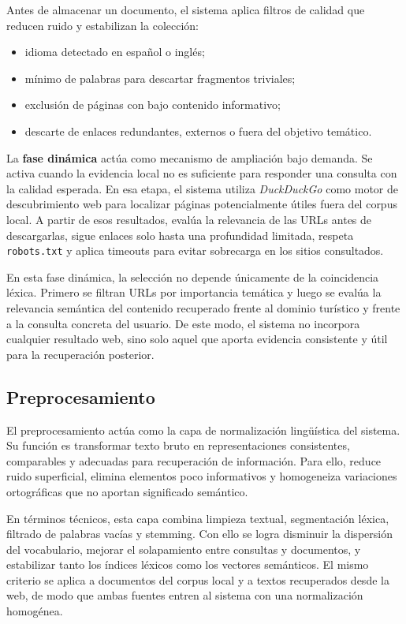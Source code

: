 \documentclass{llncs}
\begin{document}
Antes de almacenar un documento, el sistema aplica filtros de calidad que reducen ruido y estabilizan la colección:

\begin{itemize}
    \item idioma detectado en español o inglés;
    \item mínimo de palabras para descartar fragmentos triviales;
    \item exclusión de páginas con bajo contenido informativo;
    \item descarte de enlaces redundantes, externos o fuera del objetivo temático.
\end{itemize}

La \textbf{fase dinámica} actúa como mecanismo de ampliación bajo demanda. Se activa cuando la evidencia local no es suficiente para responder una consulta con la calidad esperada. En esa etapa, el sistema utiliza \textit{DuckDuckGo} como motor de descubrimiento web para localizar páginas potencialmente útiles fuera del corpus local. A partir de esos resultados, evalúa la relevancia de las URLs antes de descargarlas, sigue enlaces solo hasta una profundidad limitada, respeta \texttt{robots.txt} y aplica timeouts para evitar sobrecarga en los sitios consultados.

En esta fase dinámica, la selección no depende únicamente de la coincidencia léxica. Primero se filtran URLs por importancia temática y luego se evalúa la relevancia semántica del contenido recuperado frente al dominio turístico y frente a la consulta concreta del usuario. De este modo, el sistema no incorpora cualquier resultado web, sino solo aquel que aporta evidencia consistente y útil para la recuperación posterior.

\subsection{Preprocesamiento}

El preprocesamiento actúa como la capa de normalización lingüística del sistema. Su función es transformar texto bruto en representaciones consistentes, comparables y adecuadas para recuperación de información. Para ello, reduce ruido superficial, elimina elementos poco informativos y homogeneiza variaciones ortográficas que no aportan significado semántico.

En términos técnicos, esta capa combina limpieza textual, segmentación léxica, filtrado de palabras vacías y stemming. Con ello se logra disminuir la dispersión del vocabulario, mejorar el solapamiento entre consultas y documentos, y estabilizar tanto los índices léxicos como los vectores semánticos. El mismo criterio se aplica a documentos del corpus local y a textos recuperados desde la web, de modo que ambas fuentes entren al sistema con una normalización homogénea.
\end{document}
